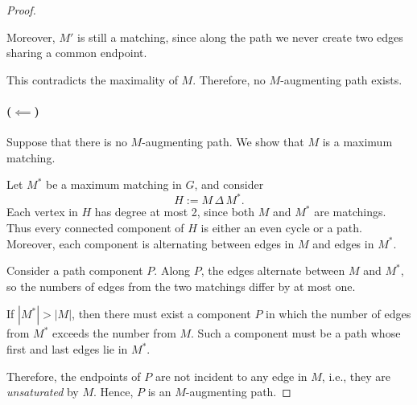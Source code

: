 \begin{proof}
\begin{center}
\end{center}

Moreover, \( M' \) is still a matching, since along the path we never create two edges sharing a common endpoint.

This contradicts the maximality of \( M \). Therefore, no \( M \)-augmenting path exists.

\paragraph{(\(\impliedby\))} 
Suppose that there is no \( M \)-augmenting path. We show that \( M \) is a maximum matching.

Let \( M^* \) be a maximum matching in \( G \), and consider
\[
H := M \,\Delta\, M^*.
\]
Each vertex in \( H \) has degree at most 2, since both \( M \) and \( M^* \) are matchings. Thus every connected component of \( H \) is either an even cycle or a path. Moreover, each component is alternating between edges in \( M \) and edges in \( M^* \).

Consider a path component \( P \). Along \( P \), the edges alternate between \( M \) and \( M^* \), so the numbers of edges from the two matchings differ by at most one.

If \( |M^*| > |M| \), then there must exist a component \( P \) in which the number of edges from \( M^* \) exceeds the number from \( M \). Such a component must be a path whose first and last edges lie in \( M^* \).

Therefore, the endpoints of \( P \) are not incident to any edge in \( M \), i.e., they are \emph{unsaturated} by \( M \). Hence, \( P \) is an \( M \)-augmenting path.


\end{proof}
